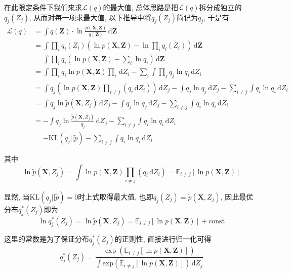 \documentclass[a4paper,UTF8]{ctexart}
\theoremstyle{plain} \newtheorem{theorem}{定理}[section]
\theoremstyle{plain} \newtheorem{definition}{定义}[section]
\theoremstyle{plain} \newtheorem{lemma}{引理}[section]
\theoremstyle{plain} \newtheorem{proposition}{命题}[section]
\theoremstyle{plain} \newtheorem{example}{例}[section]
\theoremstyle{plain} \newtheorem{remark}{注}[section]
\theoremstyle{plain} \newtheorem{corollary}{推论}[section]
\newcommand\diff{\,{\mathrm d}} %
\begin{document}
在此限定条件下我们来求$\mathcal{L}(q)$的最大值, 总体思路是把$\mathcal{L}(q)$拆分成独立的$q_{j}(Z_{j})$, 从而对每一项求最大值, 以下推导中将$q_{j}(Z_{j})$简记为$q_{j}$, 于是有
\begin{align*}
\mathcal{L}(q) & = \int q(\bm{Z}) \cdot \ln \frac{p(\bm{X}, \bm{Z})}{q(\bm{Z})} \diff \bm{Z} \\
& = \int \prod_{i} q_{i}(Z_{i}) \left( \ln p(\bm{X}, \bm{Z}) - \ln \prod_{i}q_{i}(Z_{i}) \right) \diff \bm{Z} \\
& = \int \prod_{i} q_{i} \left( \ln p(\bm{X}, \bm{Z}) - \sum_{i} \ln q_{i} \right) \diff \bm{Z} \\
& = \int \prod_{i} q_{i} \ln p(\bm{X}, \bm{Z}) \prod_{i} \diff Z_{i} - \sum_{i} \int \prod_{j} q_{j} \ln q_{i} \diff Z_{i} \\
& = \int q_{j} \left( \ln p(\bm{X}, \bm{Z}) \prod_{i \neq j} (q_{i} \diff Z_{i}) \right) \diff Z_{j} - \int q_{j} \ln q_{j} \diff Z_{j} - \sum_{i \neq j} \int q_{i} \ln q_{i} \diff Z_{i} \\
& = \int q_{j} \ln \tilde{p}(\bm{X},Z_{j}) \diff Z_{j} - \int q_{j} \ln q_{j} \diff Z_{j} - \sum_{i \neq j} \int q_{i} \ln q_{i} \diff Z_{i} \\
& = - \int q_{j} \ln \frac{\tilde{p}(\bm{X},Z_{j})}{q_{j}} \diff Z_{j} - \sum_{i \neq j} \int q_{i} \ln q_{i} \diff Z_{i} \\
& = - \mathrm{KL}(q_{j} || \tilde{p}) - \sum_{i \neq j} \int q_{i} \ln q_{i} \diff Z_{i}
\end{align*}

其中
\begin{equation*}
\ln \tilde{p}(\bm{X}, Z_{j}) = \int \ln p(\bm{X}, \bm{Z}) \prod_{i \neq j} (q_{i} \diff Z_{i}) = \mathbb{E}_{i \neq j}[\ln p(\bm{X}, \bm{Z})]
\end{equation*}

显然, 当$\mathrm{KL}(q_{j} || \tilde{p}) = 0$时上式取得最大值, 也即$q_{j}(Z_{j}) = \tilde{p}(\bm{X}, Z_{j})$, 因此最优分布$q_{j}^{*}(Z_{j})$即为
\begin{equation*}
\ln q_{j}^{*}(Z_{j}) = \ln \tilde{p}(\bm{X}, Z_{j}) = \mathbb{E}_{i \neq j}[\ln p(\bm{X}, \bm{Z})] + \textrm{const}
\end{equation*}

这里的常数是为了保证分布$q_{j}^{*}(Z_{j})$的正则性, 直接进行归一化可得
\begin{equation*}
q_{j}^{*}(Z_{j}) = \frac{\exp(\mathbb{E}_{i \neq j}[\ln p(\bm{X}, \bm{Z})])}{\displaystyle \int \mathrm{exp}(\mathbb{E}_{i \neq j}[\ln p(\bm{X}, \bm{Z})]) \diff Z_{j}}
\end{equation*}
\end{document}

